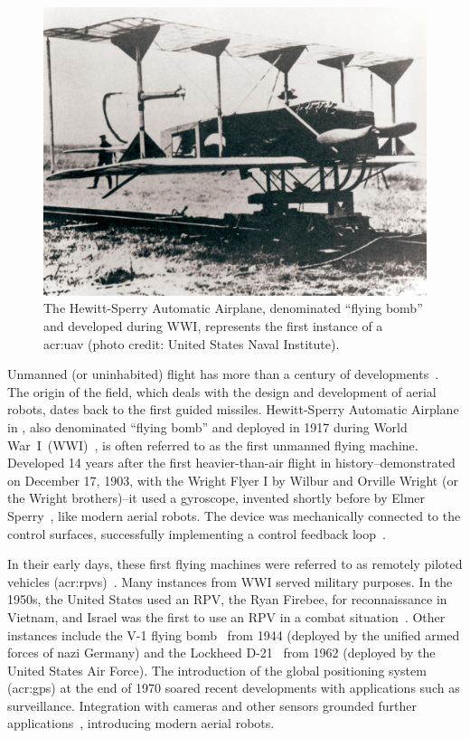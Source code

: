 \begin{figure}[t]
  \centering
  \includegraphics[width=.7\textwidth]{pictures/HA-NH-JA-19_1}
  \caption[Hewitt-Sperry Automatic Airplane, the first unmanned flying machine]{The Hewitt-Sperry Automatic Airplane, denominated ``flying bomb'' and developed during WWI, represents the first instance of a \Gls{acr:uav} {\scriptsize(photo credit: United States Naval Institute)}.}   
  \label{fig:hewitt-sperry}
\end{figure}
Unmanned (or uninhabited) flight has more than a century of developments~\citep{siciliano2016springer}. The origin of the field, which deals with the design and development of aerial robots, dates back to the first guided missiles. Hewitt-Sperry Automatic Airplane in , also denominated ``flying bomb'' and deployed in 1917 during World War~I~(WWI)~\citep{keane2013brief,valavanis2015handbook}, is often referred to as the first unmanned flying machine. Developed 14 years after the first heavier-than-air flight in history--demonstrated on December 17, 1903, with the Wright Flyer I by Wilbur and Orville Wright (or the Wright brothers)--it used a gyroscope, invented shortly before by Elmer Sperry~\citep{keane2013brief}, like modern aerial robots. The device was mechanically connected to the control surfaces, successfully implementing a control feedback loop~\citep{siciliano2016springer}.

In their early days, these first flying machines were referred to as remotely piloted vehicles (\Gls{acr:rpv}s)~\citep{anderson2005introduction}. Many instances from WWI served military purposes. In the 1950s, the United States used an RPV, the Ryan Firebee, for reconnaissance in Vietnam, and Israel was the first to use an RPV in a combat situation~\citep{anderson2005introduction}. Other instances include the V-1 flying bomb~ from 1944 (deployed by the unified armed forces of nazi Germany) and the Lockheed D-21~ from 1962 (deployed by the United States Air Force). The introduction of the global positioning system (\Gls{acr:gps}) at the end of 1970 soared recent developments with applications such as surveillance. Integration with cameras and other sensors grounded further applications~\citep{siciliano2016springer}, introducing modern aerial robots.

